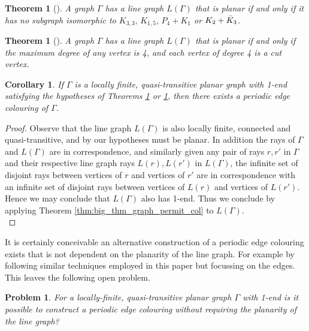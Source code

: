 \documentclass{article}
\numberwithin{equation}{section}
\newtheorem{theorem}[lemma]{Theorem}
\newtheorem{corollary}[lemma]{Corollary}
\newtheorem{problem}{Problem}[section]
\theoremstyle{definition}
\theoremstyle{remark}
\begin{document}
 \begin{theorem}[\cite{GREENWELL197231}]\label{thm:line_2}
    A graph $\Gamma$ has a line graph $L(\Gamma)$ that is planar if and only if it has no subgraph isomorphic to $K_{3,3},\,K_{1,5},\,P_4+K_1$ or $K_2+\Bar{K}_3$.
\end{theorem}
\begin{theorem}[\cite{Sedla_line_graph}]\label{thm:line_1}
    A graph $\Gamma$ has a line graph $L(\Gamma)$ that is planar if and only if the maximum degree of any vertex is 4, and each vertex of degree 4 is a cut vertex.
\end{theorem}
\begin{corollary}
    If $\Gamma$ is a locally finite, quasi-transitive planar graph with 1-end satisfying the hypotheses of Theorems \ref{thm:line_1} or \ref{thm:line_2}, then there exists a periodic edge colouring of $\Gamma$.
\end{corollary}
\begin{proof}
    Observe that the line graph $L(\Gamma)$ is also locally finite, connected and quasi-transitive, and by our hypotheses must be planar. In addition the rays of $\Gamma$ and $L(\Gamma)$ are in correspondence, and similarly given any pair of rays $r,r'$ in $\Gamma$ and their respective line graph rays $L(r), L(r')$ in $L(\Gamma)$, the infinite set of disjoint rays between vertices of $r$ and vertices of $r'$ are in correspondence with an infinite set of disjoint rays between vertices of $L(r)$ and vertices of $L(r')$. Hence we may conclude that $L(\Gamma)$ also has 1-end. Thus we conclude by applying Theorem \ref{thm:big_thm_graph_permit_col} to $L(\Gamma)$.\\
\end{proof}
It is certainly conceivable an alternative construction of a periodic edge colouring exists that is not dependent on the planarity of the line graph. For example by following similar techniques employed in this paper but focussing on the edges. This leaves the following open problem.
\begin{problem}
    For a locally-finite, quasi-transitive planar graph $\Gamma$ with 1-end is it possible to construct a periodic edge colouring without requiring the planarity of the line graph?
\end{problem}
\end{document}
